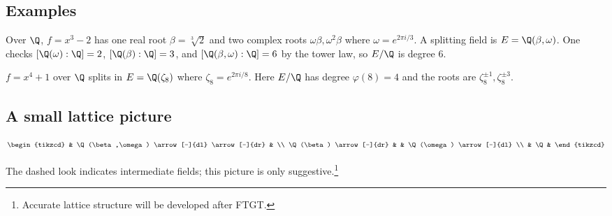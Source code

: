 \subsection{Examples}
\begin{example}[Cubic $x^3-2$]
Over $\Q$, $f=x^3-2$ has one real root $\beta=\sqrt[3]{2}$ and two complex roots $\omega\beta,\omega^2\beta$ where $\omega=e^{2\pi i/3}$.  
A splitting field is $E=\Q(\beta,\omega)$. One checks $[\Q(\omega):\Q]=2$, $[\Q(\beta):\Q]=3$, and $[\Q(\beta,\omega):\Q]=6$ by the tower law, so $E/\Q$ is degree $6$.
\end{example}

\begin{example}
$f=x^4+1$ over $\Q$ splits in $E=\Q(\zeta_8)$ where $\zeta_8=e^{2\pi i/8}$. Here $E/\Q$ has degree $\varphi(8)=4$ and the roots are $\zeta_8^{\pm1},\zeta_8^{\pm3}$.
\end{example}

\subsection{A small lattice picture}
\[
\begin{tikzcd}
& \Q(\beta,\omega) \arrow[-]{dl} \arrow[-]{dr} & \\
\Q(\beta) \arrow[-]{dr} & & \Q(\omega) \arrow[-]{dl} \\
& \Q &
\end{tikzcd}
\]
\begin{remark}
The dashed look indicates intermediate fields; this picture is only suggestive.\footnote{Accurate lattice structure will be developed after FTGT.}
\end{remark}
